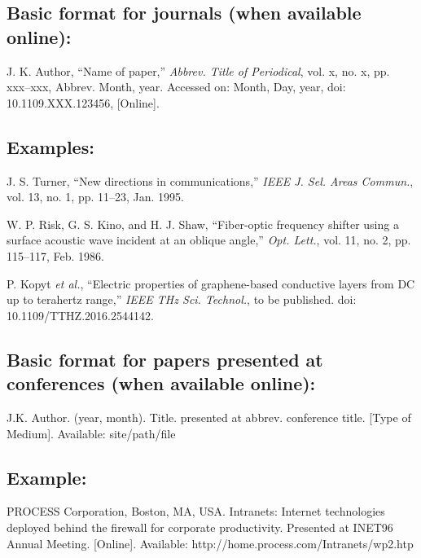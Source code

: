 \documentclass[journal]{IEEEtran}
\begin{document}
\subsection*{Basic format for journals (when available online):}

J. K. Author, ``Name of paper,'' {\em Abbrev. Title of Periodical}, vol. x, no. x, pp. xxx--xxx, Abbrev. Month, year. Accessed on: Month, Day, year, doi: 10.1109.XXX.123456, [Online].

\subsection*{Examples:}

\begin{thebibliography}{34}
\setcounter{enumiv}{13}

\bibitem{}J. S. Turner, ``New directions in communications,'' {\em IEEE J. Sel. Areas Commun.}, vol. 13, no. 1, pp. 11--23, Jan. 1995. 

\bibitem{} W. P. Risk, G. S. Kino, and H. J. Shaw, ``Fiber-optic frequency shifter using a surface acoustic wave incident at an oblique angle,'' {\em Opt. Lett.}, vol. 11, no. 2, pp. 115--117, Feb. 1986.

\bibitem{} P. Kopyt {\em et al.}, ``Electric properties of graphene-based conductive layers from DC up to terahertz range,'' {\em IEEE THz Sci. Technol.}, to be published. doi: 10.1109/TTHZ.2016.2544142.
\end{thebibliography}

\subsection*{Basic format for papers presented at conferences (when available online):}

J.K. Author. (year, month). Title. presented at abbrev. conference title. [Type of Medium]. Available: site/path/file

\subsection*{Example:}

\begin{thebibliography}{34}
\setcounter{enumiv}{16}

\bibitem{}PROCESS Corporation, Boston, MA, USA. Intranets: Internet technologies deployed behind the firewall for corporate productivity. Presented at INET96 Annual Meeting. [Online]. Available: http://home.process.com/Intranets/wp2.htp
\end{thebibliography}
\end{document}
